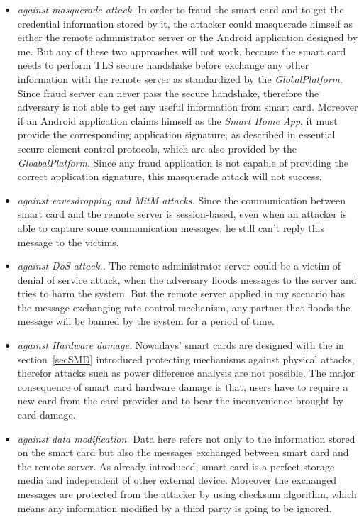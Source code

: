 \begin{itemize}
\item \emph{against masquerade attack.} In order to fraud the smart card and to get the credential information stored by it, the attacker could masquerade  himself as either the remote administrator server or the Android application designed by me.  But any of these two approaches will not work, because the smart card needs to perform TLS secure handshake before exchange any other information with the remote server as standardized by the \emph{GlobalPlatform}. Since fraud server can never pass the secure handshake, therefore the adversary is not able to get any useful information from smart card. Moreover if an Android application claims himself as the \emph{Smart Home App}, it must provide the corresponding application signature, as described in essential secure element  control protocols, which are also provided by the \emph{GloabalPlatform}. Since any fraud application is not capable of providing the correct application signature, this masquerade attack will not success. 
\item \emph{against eavesdropping and MitM attacks.} Since the communication between smart card and the remote server is session-based, even when an attacker is able to capture some communication messages, he still can't reply this message to the victims. 
\item \emph{against DoS attack..} The remote administrator server could be a victim of denial of service attack, when the adversary floods messages to the server and tries to harm the system. But the remote server applied in my scenario has the message exchanging rate control  mechanism, any partner that floods the message will be banned by the system for a period of time.
\item \emph{against Hardware damage.} Nowadays' smart cards are designed with the in section~\ref{secSMD} introduced protecting mechanisms against physical attacks, therefor attacks such as power difference analysis are not possible. The major consequence of smart card hardware damage is that, users have to require a new card from the card provider and to bear the inconvenience brought by card damage. 
\item \emph{against data modification.} Data here refers not only to the information stored on the smart card but also the messages exchanged between smart card and the remote server.  As already introduced, smart card is a perfect storage media and independent of other external device. Moreover the exchanged messages are protected from the attacker by using checksum algorithm, which means any information modified by a third party is going to be ignored.
\end{itemize}

